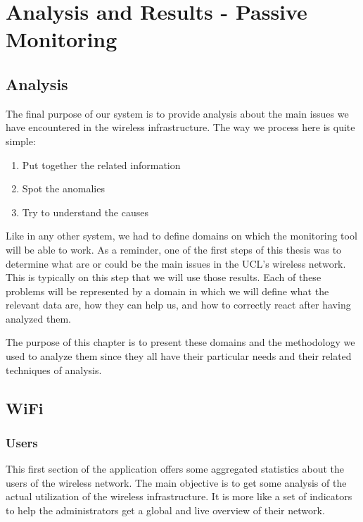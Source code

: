 
\chapter{Analysis and Results - Passive Monitoring} %

\label{Chapter5} %


\section{Analysis}
The final purpose of our system is to provide analysis about the main issues we have encountered in the wireless infrastructure. The way we process here is quite simple:

\begin{enumerate}
\item Put together the related information
\item Spot the anomalies
\item Try to understand the causes
\end{enumerate}
Like in any other system, we had to define domains on which the monitoring tool will be able to work. As a reminder, one of the first steps of this thesis was to determine what are or could be the main issues in the UCL's wireless network. This is typically on this step that we will use those results. Each of these problems will be represented by a domain in which we will define what the relevant data are, how they can help us, and how to correctly react after having analyzed them. 

The purpose of this chapter is to present these domains and the methodology we used to analyze them since they all have their particular needs and their related techniques of analysis.

\section{WiFi}

\subsection{Users}
This first section of the application offers some aggregated statistics about the users of the wireless network. The main objective is to get some analysis of the actual utilization of the wireless infrastructure. It is more like a set of indicators to help the administrators get a global and live overview of their network. 

